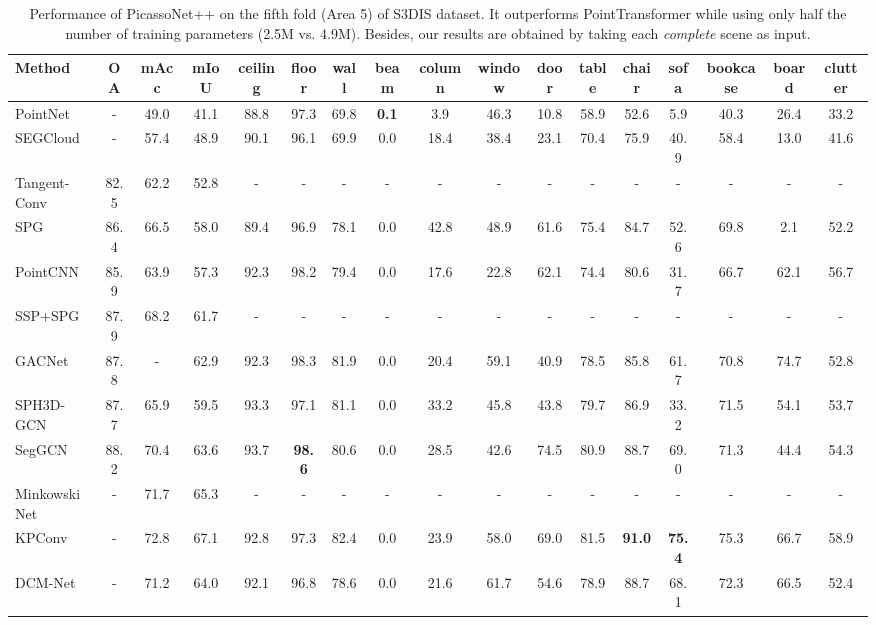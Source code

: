 \begin{table*}[!t]
\caption{\color{black}Performance of PicassoNet++ on the fifth fold (Area 5) of S3DIS dataset. It outperforms PointTransformer while using only half the number of training parameters (2.5M vs. 4.9M). Besides, our results are obtained by taking each \textit{complete} scene as input. 
}\label{tab:s3dis_seg_review} 
\vspace{-1.5mm}
\begin{adjustbox}{width=1\textwidth}
{\Huge\begin{tabular}{l|ccc|ccccccccccccc}
\hline
Method& OA& mAcc & mIoU & ceiling & floor & wall & beam & column & window & door & table & chair & sofa & bookcase & board & clutter \\
\hline
 PointNet \cite{qi2017pointnet}& - &49.0 &41.1 &88.8 &97.3 &69.8 &\textbf{0.1} &3.9 &46.3 &10.8 &58.9 &52.6  &5.9 &40.3  &26.4 &33.2\\
SEGCloud \cite{tchapmi2017segcloud} & - &57.4 &48.9 &90.1 &96.1 &69.9 &0.0 &18.4 &38.4 &23.1 &70.4 &75.9 &40.9 &58.4 &13.0 &41.6\\
Tangent-Conv \cite{tatarchenko2018tangent}& 82.5 &62.2 &52.8 &- &- &- &- &- &- &- &- &- &- &- &- &-\\
SPG \cite{landrieu2017large} & 86.4 &66.5 &58.0 &89.4 &96.9 &78.1 &0.0 &42.8 &48.9 &61.6&75.4 &84.7 &52.6 &69.8  &2.1 &52.2\\
PointCNN \cite{li2018pointcnn}& 85.9& 63.9& 57.3& 92.3& 98.2 &79.4& 0.0 &17.6& 22.8& 62.1& 74.4& 80.6& 31.7& 66.7& 62.1& 56.7\\
SSP+SPG \cite{landrieu2019point}& 87.9 & 68.2 &61.7&- &- &- &- &- &- &- &- &- &- &- &- &-\\
GACNet \cite{wang2019attention}& 87.8 & - &62.9&92.3 &98.3 &81.9 &0.0 &20.4 &59.1 &40.9 &78.5 &85.8 &61.7 &70.8 &74.7 &52.8\\
SPH3D-GCN \cite{lei2020spherical}& 87.7 &65.9 &59.5 &93.3 &97.1 &81.1 &0.0 &33.2 &45.8 &43.8  &79.7 &86.9 &33.2 &71.5  &54.1 &53.7\\
SegGCN \cite{lei2020seggcn} & 88.2 &70.4 &63.6 &93.7 &\textbf{98.6} &80.6 &0.0
&28.5 &42.6 &74.5  &80.9
&88.7
&69.0
&71.3  &44.4 &54.3\\
 MinkowskiNet \cite{choy20194d} & -& 71.7&65.3 &- &- &- &- &- &- &- &- &- &- &- &- &-\\
KPConv \cite{thomas2019kpconv}& - & 72.8 &67.1 &92.8& 97.3& 82.4 &0.0& 23.9& 58.0& 69.0& 81.5& \textbf{91.0}& \textbf{75.4}& 75.3 & 66.7& 58.9\\
DCM-Net \cite{schult2020dualconvmesh} & - & 71.2 & 64.0 &92.1 &96.8 &78.6 &0.0 &21.6 &61.7 &54.6 &78.9 &88.7 &68.1 &72.3 &66.5 &52.4\\

\end{tabular}}
\end{adjustbox}
\end{table*}

